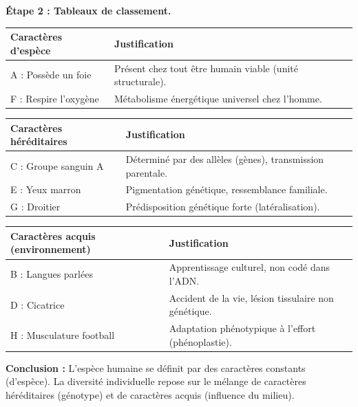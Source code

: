 \documentclass[11pt]{article}
\begin{document}
\begin{exoresolu}
\textbf{Étape 2 : Tableaux de classement.}

\begin{center}
\begin{tabularx}{\linewidth}{|l|X|}\hline
\rowcolor{popblueL} \textbf{Caractères d'espèce} & \textbf{Justification} \\ \hline
A : Possède un foie & Présent chez tout être humain viable (unité structurale). \\ 
F : Respire l'oxygène & Métabolisme énergétique universel chez l'homme. \\ \hline
\end{tabularx}
\end{center}

\begin{center}
\begin{tabularx}{\linewidth}{|l|X|}\hline
\rowcolor{popgreenL} \textbf{Caractères héréditaires} & \textbf{Justification} \\ \hline
C : Groupe sanguin A & Déterminé par des allèles (gènes), transmission parentale. \\ 
E : Yeux marron & Pigmentation génétique, ressemblance familiale. \\ 
G : Droitier & Prédisposition génétique forte (latéralisation). \\ \hline
\end{tabularx}
\end{center}

\begin{center}
\begin{tabularx}{\linewidth}{|l|X|}\hline
\rowcolor{poporangeL} \textbf{Caractères acquis (environnement)} & \textbf{Justification} \\ \hline
B : Langues parlées & Apprentissage culturel, non codé dans l'ADN. \\ 
D : Cicatrice & Accident de la vie, lésion tissulaire non génétique. \\ 
H : Musculature football & Adaptation phénotypique à l'effort (phénoplastie). \\ \hline
\end{tabularx}
\end{center}

\textbf{Conclusion :} L'espèce humaine se définit par des caractères constants (d'espèce). La diversité individuelle repose sur le mélange de caractères héréditaires (génotype) et de caractères acquis (influence du milieu).
\end{exoresolu}
\end{document}
